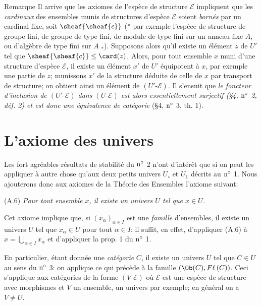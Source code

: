 \begin{enonce*}[remark]{Remarque}
Il arrive que les axiomes de l'espèce de structure $\mathcal{E}$
impliquent que les \emph{cardinaux} des ensembles munis de
structures d'espèce $\mathcal{E}$ soient \emph{bornés} par un
cardinal fixe, soit $\sheaf{\sheaf{c}}$ (* par exemple l'espèce de
structure de groupe fini, de groupe de type fini, de module de type
fini sur un anneau fixe $A$, ou d'algèbre de type fini sur $A$
${}_{\mbox{*}}$). Supposons alors qu'il existe un élément $z$ de
$U'$ tel que $\sheaf{\sheaf{c}}\leq \card(z)$. Alors, pour tout
ensemble $x$ muni d'une structure d'espèce $\mathcal{E}$, il existe
un élément $x'$ de $U'$ équipotent à $x$, par exemple une partie de
$z$; munissons $x'$ de la structure déduite de celle de $x$ par
transport de structure; on obtient ainsi un élément de
$(U'\text{-}\mathcal{E})$. Il s'ensuit que \emph{le foncteur
d'inclusion de $(U'\text{-}\mathcal{E})$ dans
$(U\text{-}\mathcal{E})$ est alors essentiellement surjectif {\rm
(\S 4, ${\rm n^{\circ}}$ 2, déf. 2)} et est donc une équivalence de
catégorie} (\S 4, ${\rm n^{\circ}}$ 3, th. 1).
\end{enonce*}

\section{L'axiome des univers}\pageoriginale

Les fort agréables résultats de stabilité du ${\rm n^{\circ}}$ 2
n'ont d'intérêt que si on peut les appliquer à autre chose qu'aux
deux petits univers $U_{\circ}$ et $U_1$ décrits au ${\rm
n^{\circ}}$ 1. Nous ajouterons donc aux axiomes de la Théorie des
Ensembles l'axiome suivant:

(A.6) \emph{Pour tout ensemble $x$, il existe un univers $U$ tel que
$x\in U$.}

Cet axiome implique que, si $(x_{\alpha})_{\alpha\in I}$ est une
\emph{famille} d'ensembles, il existe un univers $U$ tel que
$x_{\alpha}\in U$ pour tout $\alpha\in I$: il suffit, en effet,
d'appliquer (A.6) à $x=\bigcup_{\alpha\in I}x_{\alpha}$ et
d'appliquer la prop. 1 du ${\rm n^{\circ}}$ 1.

En particulier, étant donnée une \emph{catégorie} $C$, il existe un
univers $U$ tel que $C\in U$ au sens du ${\rm n^{\circ}}$ 3: on
applique ce qui précède à la famille $(\Ob(C), F\ell\, (C))$. Ceci
s'applique aux catégories de la forme $(V\text{-}\mathcal{E})$ où
$\mathcal{E}$ est une espèce de structure avec morphismes et $V$ un
ensemble, un univers par exemple; en général on a $V\neq U$.

